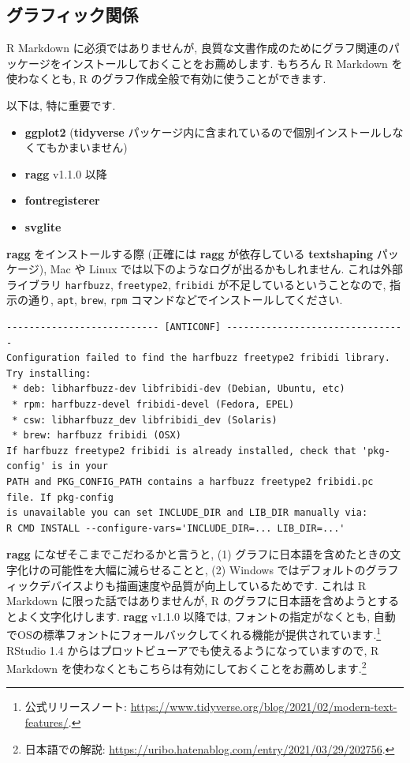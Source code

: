 \documentclass[
]{ltjsarticle}
\providecommand{\tightlist}{%
  \setlength{\itemsep}{0pt}\setlength{\parskip}{0pt}}
\begin{document}
\hypertarget{ux30b0ux30e9ux30d5ux30a3ux30c3ux30afux95a2ux4fc2}{%
\subsection{グラフィック関係}\label{ux30b0ux30e9ux30d5ux30a3ux30c3ux30afux95a2ux4fc2}}

R Markdown に必須ではありませんが, 良質な文書作成のためにグラフ関連のパッケージをインストールしておくことをお薦めします. もちろん R Markdown を使わなくとも, R のグラフ作成全般で有効に使うことができます.

以下は, 特に重要です.

\begin{itemize}
\tightlist
\item
  \textbf{ggplot2} (\textbf{tidyverse} パッケージ内に含まれているので個別インストールしなくてもかまいません)
\item
  \textbf{ragg} v1.1.0 以降
\item
  \textbf{fontregisterer}
\item
  \textbf{svglite}
\end{itemize}

\textbf{ragg} をインストールする際 (正確には \textbf{ragg} が依存している \textbf{textshaping} パッケージ), Mac や Linux では以下のようなログが出るかもしれません. これは外部ライブラリ \texttt{harfbuzz}, \texttt{freetype2}, \texttt{fribidi} が不足しているということなので, 指示の通り, \texttt{apt}, \texttt{brew}, \texttt{rpm} コマンドなどでインストールしてください.

\begin{verbatim}
--------------------------- [ANTICONF] --------------------------------
Configuration failed to find the harfbuzz freetype2 fribidi library. Try installing:
 * deb: libharfbuzz-dev libfribidi-dev (Debian, Ubuntu, etc)
 * rpm: harfbuzz-devel fribidi-devel (Fedora, EPEL)
 * csw: libharfbuzz_dev libfribidi_dev (Solaris)
 * brew: harfbuzz fribidi (OSX)
If harfbuzz freetype2 fribidi is already installed, check that 'pkg-config' is in your
PATH and PKG_CONFIG_PATH contains a harfbuzz freetype2 fribidi.pc file. If pkg-config
is unavailable you can set INCLUDE_DIR and LIB_DIR manually via:
R CMD INSTALL --configure-vars='INCLUDE_DIR=... LIB_DIR=...'
\end{verbatim}

\textbf{ragg} になぜそこまでこだわるかと言うと, (1) グラフに日本語を含めたときの文字化けの可能性を大幅に減らせることと, (2) Windows ではデフォルトのグラフィックデバイスよりも描画速度や品質が向上しているためです. これは R Markdown に限った話ではありませんが, R のグラフに日本語を含めようとするとよく文字化けします. \textbf{ragg} v1.1.0 以降では, フォントの指定がなくとも, 自動でOSの標準フォントにフォールバックしてくれる機能が提供されています.\footnote{公式リリースノート: \url{https://www.tidyverse.org/blog/2021/02/modern-text-features/}.} RStudio 1.4 からはプロットビューアでも使えるようになっていますので, R Markdown を使わなくともこちらは有効にしておくことをお薦めします.\footnote{日本語での解説: \url{https://uribo.hatenablog.com/entry/2021/03/29/202756}.}
\end{document}

